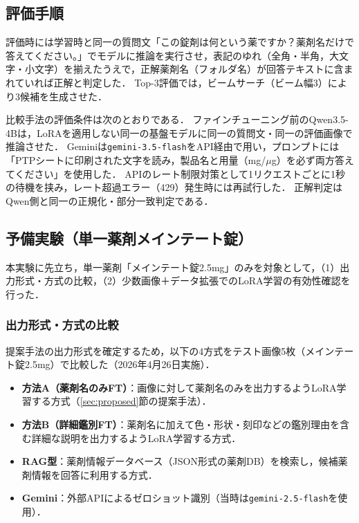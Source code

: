 \documentclass[dvipdfmx]{jsarticle}
\begin{document}
\subsection{評価手順}\label{sec:evalproc}

評価時には学習時と同一の質問文「この錠剤は何という薬ですか？薬剤名だけで答えてください。」でモデルに推論を実行させ，表記のゆれ（全角・半角，大文字・小文字）を揃えたうえで，正解薬剤名（フォルダ名）が回答テキストに含まれていれば正解と判定した．
Top-3評価では，ビームサーチ（ビーム幅3）により3候補を生成させた．

比較手法の評価条件は次のとおりである．
ファインチューニング前のQwen3.5-4Bは，LoRAを適用しない同一の基盤モデルに同一の質問文・同一の評価画像で推論させた．
Geminiは\texttt{gemini-3.5-flash}をAPI経由で用い，プロンプトには「PTPシートに印刷された文字を読み，製品名と用量（mg/$\mu$g）を必ず両方答えてください」を使用した．
APIのレート制限対策として1リクエストごとに1秒の待機を挟み，レート超過エラー（429）発生時には再試行した．
正解判定はQwen側と同一の正規化・部分一致判定である．

\subsection{予備実験（単一薬剤メインテート錠）}\label{sec:prelim}

本実験に先立ち，単一薬剤「メインテート錠2.5mg」のみを対象として，（1）出力形式・方式の比較，（2）少数画像＋データ拡張でのLoRA学習の有効性確認を行った．

\subsubsection{出力形式・方式の比較}

提案手法の出力形式を確定するため，以下の4方式をテスト画像5枚（メインテート錠2.5mg）で比較した（2026年4月26日実施）．

\begin{itemize}
  \item \textbf{方法A（薬剤名のみFT）}：画像に対して薬剤名のみを出力するようLoRA学習する方式（\ref{sec:proposed}節の提案手法）．
  \item \textbf{方法B（詳細鑑別FT）}：薬剤名に加えて色・形状・刻印などの鑑別理由を含む詳細な説明を出力するようLoRA学習する方式．
  \item \textbf{RAG型}：薬剤情報データベース（JSON形式の薬剤DB）を検索し，候補薬剤情報を回答に利用する方式．
  \item \textbf{Gemini}：外部APIによるゼロショット識別（当時は\texttt{gemini-2.5-flash}を使用）．
\end{itemize}
\end{document}
